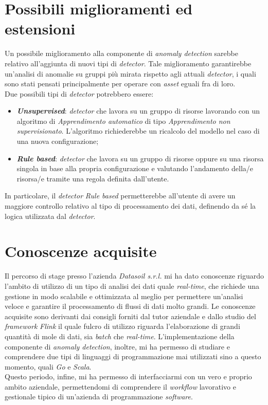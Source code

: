 \section{Possibili miglioramenti ed estensioni}
Un possibile miglioramento alla componente di \textit{anomaly detection} sarebbe relativo all'aggiunta di nuovi tipi di \textit{detector}. Tale miglioramento garantirebbe un'analisi di anomalie su gruppi più mirata rispetto agli attuali \textit{detector}, i quali sono stati pensati principalmente per operare con \textit{asset} eguali fra di loro.\\
Due possibili tipi di \textit{detector} potrebbero essere:
\begin{itemize}
	\item{\textbf{\textit{Unsupervised}}: \textit{detector} che lavora su un gruppo di risorse lavorando con un algoritmo di \textit{\gls{Apprendimento automatico}} di tipo \textit{\gls{Apprendimento non supervisionato}}. L'algoritmo richiederebbe un ricalcolo del modello nel caso di una nuova configurazione;}
	\item{\textbf{\textit{Rule based}}: \textit{detector} che lavora su un gruppo di risorse oppure su una risorsa singola in base alla propria configurazione e valutando l'andamento della/e risorsa/e tramite una regola definita dall'utente.}
\end{itemize}
In particolare, il \textit{detector} \textit{Rule based} permetterebbe all'utente di avere un maggiore controllo relativo al tipo di processamento dei dati, definendo da sé la logica utilizzata dal \textit{detector}.



\section{Conoscenze acquisite}
Il percorso di stage presso l'azienda \textit{Datasoil s.r.l.} mi ha dato conoscenze riguardo l'ambito di utilizzo di un tipo di analisi dei dati quale \textit{real-time}, che richiede una gestione in modo scalabile e ottimizzata al meglio per permettere un'analisi veloce e garantire il processamento di flussi di dati molto grandi. Le conoscenze acquisite sono derivanti dai consigli forniti dal tutor aziendale e dallo studio del \textit{\textit{\gls{framework}}} \textit{Flink} il quale fulcro di utilizzo riguarda l'elaborazione di grandi quantità di mole di dati, sia \textit{batch} che \textit{real-time}. L'implementazione della componente di \textit{anomaly detection}, inoltre, mi ha permesso di studiare e comprendere due tipi di linguaggi di programmazione mai utilizzati sino a questo momento, quali \textit{Go} e \textit{Scala}.\\
Questo periodo, infine, mi ha permesso di interfacciarmi con un vero e proprio ambito aziendale, permettendomi di comprendere il \textit{workflow} lavorativo e gestionale tipico di un'azienda di programmazione \textit{software}.

